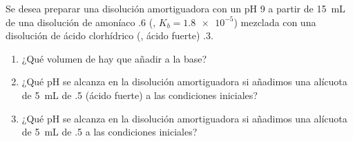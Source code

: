 Se desea preparar una disolución amortiguadora con un pH \num{9} a partir de \SI{15}{\milli\liter} de una disolución de amoníaco \SI{,6}{\Molar} (, $K_b = \num{1,8e-5}$) mezclada con una disolución de ácido clorhídrico (, ácido fuerte) \SI{,3}{\Molar}.
\begin{enumerate}[label={\alph*)},font={\color{red!50!black}\bfseries}]
	\item ¿Qué volumen de  hay que añadir a la base?
	\item ¿Qué pH se alcanza en la disolución amortiguadora si añadimos una alícuota de \SI{5}{\milli\liter} de  \SI{,5}{\Molar} (ácido fuerte) a las condiciones iniciales?
	\item ¿Qué pH se alcanza en la disolución amortiguadora si añadimos una alícuota de \SI{5}{\milli\liter} de  \SI{,5}{\Molar} a las condiciones iniciales?
\end{enumerate}
